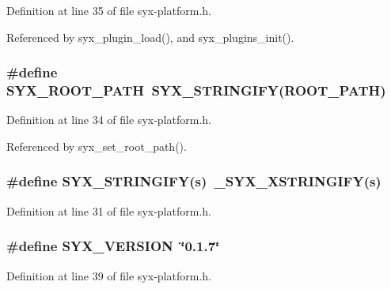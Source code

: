 Definition at line 35 of file syx-platform.h.

Referenced by syx\_\-plugin\_\-load(), and syx\_\-plugins\_\-init().\hypertarget{syx-platform_8h_84328b74550048d04344e1663dcef3fd}{
\subsubsection{\setlength{\rightskip}{0pt plus 5cm}\#define SYX\_\-ROOT\_\-PATH~SYX\_\-STRINGIFY(ROOT\_\-PATH)}}
\label{syx-platform_8h_84328b74550048d04344e1663dcef3fd}




Definition at line 34 of file syx-platform.h.

Referenced by syx\_\-set\_\-root\_\-path().\hypertarget{syx-platform_8h_622806f9d7c362423c019eec056166aa}{
\subsubsection{\setlength{\rightskip}{0pt plus 5cm}\#define SYX\_\-STRINGIFY(s)~\_\-SYX\_\-XSTRINGIFY(s)}}
\label{syx-platform_8h_622806f9d7c362423c019eec056166aa}




Definition at line 31 of file syx-platform.h.\hypertarget{syx-platform_8h_c2b54093b7f1983c5d29a360f2714a6a}{
\subsubsection{\setlength{\rightskip}{0pt plus 5cm}\#define SYX\_\-VERSION~\char`\"{}0.1.7\char`\"{}}}
\label{syx-platform_8h_c2b54093b7f1983c5d29a360f2714a6a}




Definition at line 39 of file syx-platform.h.